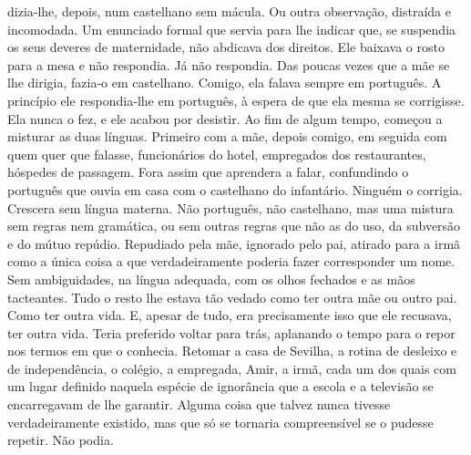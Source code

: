dizia­‑lhe, depois, num castelhano sem mácula. Ou outra observação,
distraída e incomodada. Um enunciado formal que servia para lhe indicar
que, se suspendia os seus deveres de maternidade, não abdicava dos
direitos. Ele baixava o rosto para a mesa e não respondia. Já não
respondia. Das poucas vezes que a mãe se lhe dirigia, fazia­‑o em
castelhano. Comigo, ela falava sempre em português. A princípio ele
respondia­‑lhe em português, à espera de que ela mesma se corrigisse.
Ela nunca o fez, e ele acabou por desistir. Ao fim de algum tempo,
começou a misturar as duas línguas. Primeiro com a mãe, depois comigo,
em seguida com quem quer que falasse, funcionários do hotel, empregados
dos restaurantes, hóspedes de passagem. Fora assim que aprendera a
falar, confundindo o português que ouvia em casa com o castelhano do
infantário. Ninguém o corrigia. Crescera sem língua materna. Não
português, não castelhano, mas uma mistura sem regras nem gramática, ou
sem outras regras que não as do uso, da subversão e do mútuo repúdio.
Repudiado pela mãe, ignorado pelo pai, atirado para a irmã como a única
coisa a que verdadeiramente poderia fazer corresponder um nome. Sem
ambiguidades, na língua adequada, com os olhos fechados e as mãos
tacteantes. Tudo o resto lhe estava tão vedado como ter outra mãe ou
outro pai. Como ter outra vida. E, apesar de tudo, era precisamente isso
que ele recusava, ter outra vida. Teria preferido voltar para trás,
aplanando o tempo para o repor nos termos em que o conhecia. Retomar a
casa de Sevilha, a rotina de desleixo e de independência, o colégio, a
empregada, Amir, a irmã, cada um dos quais com um lugar definido naquela
espécie de ignorância que a escola e a televisão se encarregavam de lhe
garantir. Alguma coisa que talvez nunca tivesse verdadeiramente
existido, mas que só se tornaria compreensível se o pudesse repetir. Não
podia.

